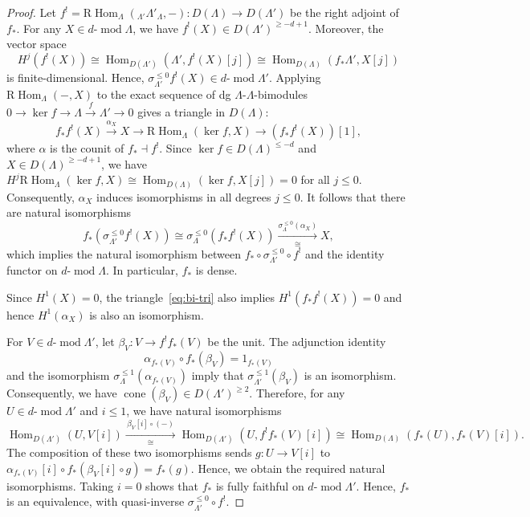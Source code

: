 \documentclass[11pt,a4paper,reqno]{amsart}
\theoremstyle{plain}
\numberwithin{equation}{section}
\theoremstyle{definition}
\renewcommand{\mod}{\operatorname{mod}}
\newcommand{\Hom}{\operatorname{Hom}}
\newcommand{\RHom}{\mathrm R\!\Hom}
\newcommand{\emod}[2]{#1\text{-}\!\mod #2}
\begin{document}
\begin{proof}
Let $f^!=\RHom_\Lambda({}_{\Lambda'}\Lambda'_\Lambda,-)\colon D(\Lambda)\to D(\Lambda')$ be the right adjoint of $f_*$. For any $X\in\emod{d}{\Lambda}$, we have $f^!(X)\in D(\Lambda')^{\geq-d+1}$. Moreover, the vector space
\[H^j(f^!(X))\cong\Hom_{D(\Lambda')}(\Lambda',f^!(X)[j])\cong\Hom_{D(\Lambda)}(f_*\Lambda',X[j])\]
is finite-dimensional. Hence, $\sigma_{\Lambda'}^{\leq 0}f^!(X)\in\emod{d}{\Lambda'}$. Applying $\mathrm R\!\Hom_\Lambda(-,X)$ to the exact sequence of dg $\Lambda$-$\Lambda$-bimodules $0\to \ker f\to \Lambda\xrightarrow{f}\Lambda'\to 0$ gives a triangle in $D(\Lambda)$:
\begin{equation}\label{eq:bi-tri}
    f_*f^!(X)\xrightarrow{\alpha_X}X\to\RHom_\Lambda(\ker f,X)\to\left(f_*f^!(X)\right)[1],
\end{equation}
where $\alpha$ is the counit of $f_*\dashv f^!$. Since $\ker f\in D(\Lambda)^{\leq-d}$ and $X\in D(\Lambda)^{\geq-d+1}$, we have $H^j\mathrm R\!\Hom_\Lambda(\ker f,X)\cong\Hom_{D(\Lambda)}(\ker f,X[j])=0$ for all $j\leq0$. Consequently, $\alpha_X$ induces isomorphisms in all degrees $j\leq0$. It follows that there are natural isomorphisms
\[
 f_*\!\left(\sigma_{\Lambda'}^{\leq0}f^!(X)\right) \cong \sigma_{\Lambda}^{\leq0}\!\left(f_*f^!(X)\right)\xrightarrow[\cong]{\sigma^{\leq 0}_{\Lambda}(\alpha_X)} X,
\]
which implies the natural isomorphism between $f_*\circ\sigma_{\Lambda'}^{\leq0}\circ f^!$ and the identity functor on $\emod{d}{\Lambda}$. In particular, $f_*$ is dense.

Since $H^1(X)=0$, the triangle~\eqref{eq:bi-tri} also implies $H^1(f_*f^!(X))=0$ and hence $H^1(\alpha_X)$ is also an isomorphism.

For $V\in\emod{d}{\Lambda'}$, let $\beta_V\colon V\to f^!f_*(V)$ be the unit. The adjunction identity
\[
 \alpha_{f_*(V)}\circ f_*(\beta_V)=1_{f_*(V)}
\]
and the isomorphism $\sigma_{\Lambda}^{\leq1}(\alpha_{f_*(V)})$ imply that $\sigma_{\Lambda'}^{\leq1}(\beta_V)$ is an isomorphism. Consequently, we have $\operatorname{cone}(\beta_V)\in D(\Lambda')^{\geq 2}$. Therefore, for any $U\in\emod{d}{\Lambda'}$ and $i\leq1$, we have natural isomorphisms
\[
 \Hom_{D(\Lambda')}(U,V[i])\xrightarrow[\cong]{\,\beta_V[i]\circ(-)\,}\Hom_{D(\Lambda')}(U,f^!f_*(V)[i])\cong\Hom_{D(\Lambda)}(f_*(U),f_*(V)[i]).
\]
The composition of these two isomorphisms sends $g\colon U\to V[i]$ to $\alpha_{f_*(V)}[i]\circ f_*\left(\beta_V[i]\circ g\right)=f_*(g)$. Hence, we obtain the required natural isomorphisms. Taking $i=0$ shows that $f_*$ is fully faithful on $\emod{d}{\Lambda'}$. Hence, $f_*$ is an equivalence, with quasi-inverse $\sigma_{\Lambda'}^{\leq0}\circ f^!$.
\end{proof}
\end{document}
